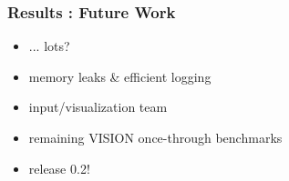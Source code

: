 
\begin{frame}[ctb!]
  \frametitle{Results : Future Work}
  \begin{itemize}
    \item ... lots?
    \item memory leaks \& efficient logging
    \item input/visualization team
    \item remaining VISION once-through benchmarks
    \item release 0.2!
  \end{itemize}
\end{frame}

